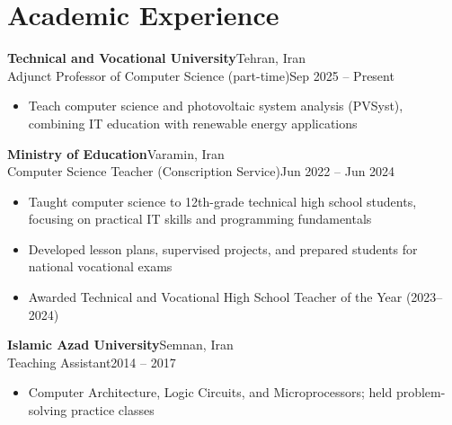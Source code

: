 \documentclass[10pt]{article}
\newcommand{\entry}[4]{\needspace{4\baselineskip}\textbf{#1}\hfill #2\\#3\hfill #4\par}
\newenvironment{dashes}{\begin{itemize}[label=--,leftmargin=2.2em,topsep=1pt,itemsep=0pt,parsep=0pt]}{\end{itemize}}
\newcommand{\gap}{\vspace{3pt}}
\begin{document}
\section{Academic Experience}
\entry{Technical and Vocational University}{Tehran, Iran}{Adjunct Professor of Computer Science (part-time)}{Sep 2025 -- Present}
\begin{dashes}
\item Teach computer science and photovoltaic system analysis (PVSyst), combining IT education with renewable energy applications
\end{dashes}
\gap
\entry{Ministry of Education}{Varamin, Iran}{Computer Science Teacher (Conscription Service)}{Jun 2022 -- Jun 2024}
\begin{dashes}
\item Taught computer science to 12th-grade technical high school students, focusing on practical IT skills and programming fundamentals
\item Developed lesson plans, supervised projects, and prepared students for national vocational exams
\item Awarded Technical and Vocational High School Teacher of the Year (2023--2024)
\end{dashes}
\gap
\entry{Islamic Azad University}{Semnan, Iran}{Teaching Assistant}{2014 -- 2017}
\begin{dashes}
\item Computer Architecture, Logic Circuits, and Microprocessors; held problem-solving practice classes
\end{dashes}
\end{document}
